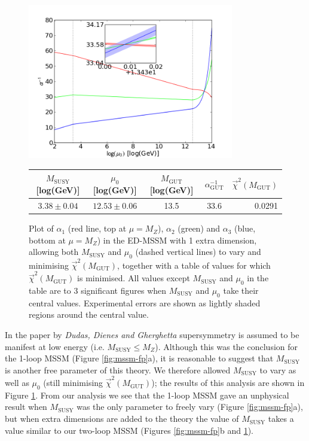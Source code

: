 \documentclass[12pt,a4paper,oneside]{article}
\begin{document}
\begin{figure}[th]
\begin{center}
\includegraphics[width=9cm]{figs/1ed-2param-fit.png}

\begin{tabular}{cc|cc|r}
$M_\mathrm{SUSY}$ [log(GeV)] & $\mu_0$ [log(GeV)] & $M_\mathrm{GUT}$ [log(GeV)] & $\alpha^{-1}_\mathrm{GUT}$ & $\overrightarrow{\chi}^2 (M_\mathrm{GUT})$ \\
\hline
$3.38 \pm 0.04$ & $12.53\pm 0.06$ & 13.5 & 33.6 & 0.0291 \\
\end{tabular}

\caption[]{Plot of $\alpha_1$ (red line, top at $\mu = M_Z$), $\alpha_2$ (green) and $\alpha_3$ (blue, bottom at $\mu = M_Z$) in the ED-MSSM with 1 extra dimension, allowing both $M_\mathrm{SUSY}$ and $\mu_0$ (dashed vertical lines) to vary and minimising $\overrightarrow{\chi}^2 (M_\mathrm{GUT})$, together with a table of values for which $\overrightarrow{\chi}^2 (M_\mathrm{GUT})$ is minimised. All values except $M_\mathrm{SUSY}$ and $\mu_0$ in the table are to 3 significant figures when $M_\mathrm{SUSY}$ and $\mu_0$ take their central values. Experimental errors are shown as lightly shaded regions around the central value.}
\label{fig:ed-2param-fit}
\end{center}
\end{figure}

In the paper by \textit{Dudas, Dienes and Gherghetta} supersymmetry is assumed to be manifest at low energy (i.e. $M_\mathrm{SUSY} \leq M_Z$). Although this was the conclusion for the 1-loop MSSM (Figure \ref{fig:mssm-fp}a), it is reasonable to suggest that $M_\mathrm{SUSY}$ is another free parameter of this theory. We therefore allowed $M_\mathrm{SUSY}$ to vary as well as $\mu_0$ (still minimising $\overrightarrow{\chi}^2 (M_\mathrm{GUT})$); the results of this analysis are shown in Figure \ref{fig:ed-2param-fit}. From our analysis we see that the 1-loop MSSM gave an unphysical result when $M_\mathrm{SUSY}$ was the only parameter to freely vary (Figure \ref{fig:mssm-fp}a), but when extra dimensions are added to the theory the value of $M_\mathrm{SUSY}$ takes a value similar to our two-loop MSSM (Figures \ref{fig:mssm-fp}b and \ref{fig:ed-2param-fit}). 
\end{document}
